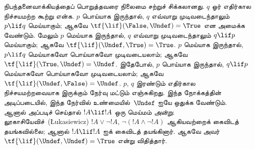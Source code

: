 \documentclass[../../../include/open-logic-section]{subfiles}
\begin{document}
நிபந்தனைவாக்கியத்தைப் பொறுத்தவரை நிலைமை சற்றுச் சிக்கலானது. $q$ ஓர்
எதிர்கால நிச்சயமற்ற கூற்று என்க. $p$ பொய்யாக இருந்தால், $q$ எவ்வாறு
முடிவடைந்தாலும் $p \lif q$ மெய்யாகும்; ஆகவே
$\tf{\lif}(\False, \Undef) = \True$ என அமைக்க வேண்டும். மேலும் $p$
மெய்யாக இருந்தால், $q$ எவ்வாறு முடிவடைந்தாலும் $q \lif p$ மெய்யாகும்;
ஆகவே $\tf{\lif}(\Undef, \True) = \True$. $p$ மெய்யாக இருந்தால்,
$p \lif q$ மெய்யாகவோ பொய்யாகவோ முடிவடையலாம்; ஆகவே
$\tf{\lif}(\True, \Undef) = \Undef$. இதேபோல், $p$ பொய்யாக இருந்தால்,
$q \lif p$ மெய்யாகவோ பொய்யாகவோ முடிவடையலாம்; ஆகவே
$\tf{\lif}(\Undef, \False) = \Undef$. $p$, $q$ இரண்டும் எதிர்கால
நிச்சயமற்றவையாக இருக்கும் நேர்வு மட்டும் எஞ்சுகிறது. இந்த நோக்கத்தின்
அடிப்படையில், இந்த நேர்வில் உண்மையில்~$\Undef$ ஐயே ஒதுக்க வேண்டும்.
ஆனால் அப்படிச் செய்தால் $!A \lif !A$ ஒரு மெய்மம் \emph{அன்று}.
லூகாசியேவிச்~(\L ukasiewicz) $!A \lor \lnot !A$,
$\lnot(!A \land \lnot !A)$ ஆகியவற்றைக்
கைவிடத் தயங்கவில்லை; ஆனால் $!A \lif !A$ ஐக் கைவிடத் தயங்கினார். ஆகவே அவர்
$\tf{\lif}(\Undef, \Undef) = \True$ என்று விதித்தார்.
\end{document}
